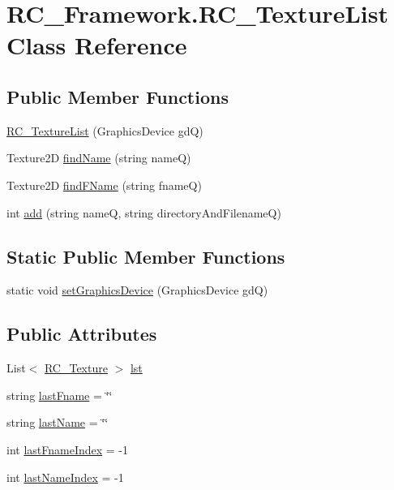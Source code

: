 \hypertarget{class_r_c___framework_1_1_r_c___texture_list}{}\section{R\+C\+\_\+\+Framework.\+R\+C\+\_\+\+Texture\+List Class Reference}
\label{class_r_c___framework_1_1_r_c___texture_list}
\subsection*{Public Member Functions}
\begin{DoxyCompactItemize}
\item 
\mbox{\hyperlink{class_r_c___framework_1_1_r_c___texture_list_aae5e2fc95b13e241affc4a696ab6e508}{R\+C\+\_\+\+Texture\+List}} (Graphics\+Device gdQ)
\item 
Texture2D \mbox{\hyperlink{class_r_c___framework_1_1_r_c___texture_list_a7808011a235b40252d5bb26e31933935}{find\+Name}} (string nameQ)
\item 
Texture2D \mbox{\hyperlink{class_r_c___framework_1_1_r_c___texture_list_a8721dbdb2bead7b4d944ca4cd4a855d8}{find\+F\+Name}} (string fnameQ)
\item 
int \mbox{\hyperlink{class_r_c___framework_1_1_r_c___texture_list_a9662672a6fcc69b081b6c81c8f687cc0}{add}} (string nameQ, string directory\+And\+FilenameQ)
\end{DoxyCompactItemize}
\subsection*{Static Public Member Functions}
\begin{DoxyCompactItemize}
\item 
static void \mbox{\hyperlink{class_r_c___framework_1_1_r_c___texture_list_aff35713e3de24adacb1a9f0af8a72c69}{set\+Graphics\+Device}} (Graphics\+Device gdQ)
\end{DoxyCompactItemize}
\subsection*{Public Attributes}
\begin{DoxyCompactItemize}
\item 
List$<$ \mbox{\hyperlink{class_r_c___framework_1_1_r_c___texture}{R\+C\+\_\+\+Texture}} $>$ \mbox{\hyperlink{class_r_c___framework_1_1_r_c___texture_list_a6950b7580eb7cd5747ca6682008c3a64}{lst}}
\item 
string \mbox{\hyperlink{class_r_c___framework_1_1_r_c___texture_list_aa8235e83c49774ed1184ae7126442015}{last\+Fname}} = \char`\"{}\char`\"{}
\item 
string \mbox{\hyperlink{class_r_c___framework_1_1_r_c___texture_list_af23423b4df3068eccf372963ee08ced7}{last\+Name}} = \char`\"{}\char`\"{}
\item 
int \mbox{\hyperlink{class_r_c___framework_1_1_r_c___texture_list_a7705162cf341c61080ed84f5483fcfad}{last\+Fname\+Index}} = -\/1
\item 
int \mbox{\hyperlink{class_r_c___framework_1_1_r_c___texture_list_a87cba73bbbd0798f18f3a5638707c089}{last\+Name\+Index}} = -\/1
\end{DoxyCompactItemize}
